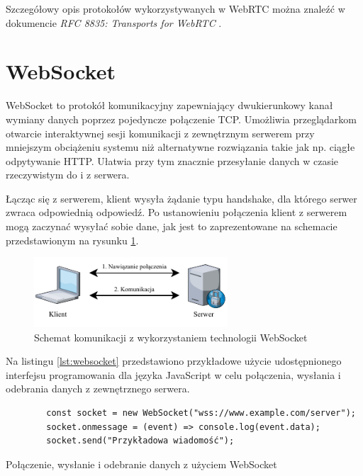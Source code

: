 \documentclass[language=polish,type=master]{aghmodern}
\begin{document}
Szczegółowy opis protokołów wykorzystywanych w WebRTC można znaleźć w dokumencie \emph{RFC 8835: Transports for WebRTC} \cite{RFC8835}.

\section{WebSocket}
WebSocket to protokół komunikacyjny zapewniający dwukierunkowy kanał wymiany danych poprzez pojedyncze połączenie TCP.
Umożliwia przeglądarkom otwarcie interaktywnej sesji komunikacji z zewnętrznym serwerem przy mniejszym obciążeniu systemu niż alternatywne rozwiązania takie jak np. ciągłe odpytywanie HTTP.
Ułatwia przy tym znacznie przesyłanie danych w czasie rzeczywistym do i z serwera.

Łącząc się z serwerem, klient wysyła żądanie typu handshake\footnotemark{}, dla którego serwer zwraca odpowiednią odpowiedź.
Po ustanowieniu połączenia klient z serwerem mogą zaczynać wysyłać sobie dane, jak jest to zaprezentowane na schemacie przedstawionym na rysunku \ref{fig:websocket}.

\begin{figure}[H]
    \centering
    \vspace*{15pt}
    \includegraphics[width=0.6435\textwidth]{images/websocket.pdf}
    \caption{Schemat komunikacji z wykorzystaniem technologii WebSocket}
    \label{fig:websocket}
\end{figure}

Na listingu \ref{lst:websocket} przedstawiono przykładowe użycie udostępnionego interfejsu programowania dla języka JavaScript w celu połączenia, wysłania i odebrania danych z zewnętrznego serwera.

\begin{listing}[H]
    \begin{verbatim}
        const socket = new WebSocket("wss://www.example.com/server");
        socket.onmessage = (event) => console.log(event.data);
        socket.send("Przykładowa wiadomość");
    \end{verbatim}
    \caption{Połączenie, wysłanie i odebranie danych z użyciem WebSocket}
    \label{lst:websocket}
\end{listing}
\end{document}

